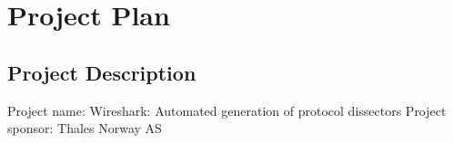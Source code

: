 \part{Project Plan}

\chapter{Project Description}
Project name: Wireshark: Automated generation of protocol dissectors
Project sponsor: Thales Norway AS
